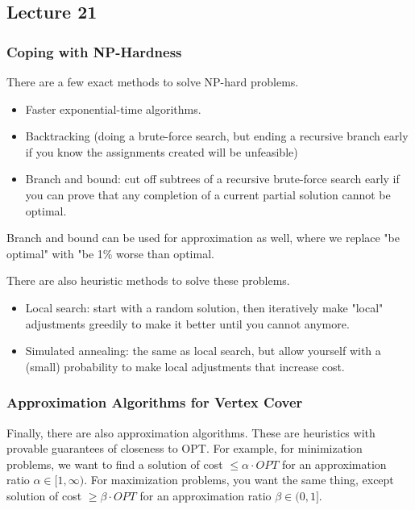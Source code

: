 \subsection{Lecture 21}
\subsubsection{Coping with NP-Hardness}

There are a few exact methods to solve NP-hard problems.
\begin{itemize}
    \item Faster exponential-time algorithms.
    \item Backtracking (doing a brute-force search, but ending a recursive branch early if you know the assignments created will be unfeasible)
    \item Branch and bound: cut off subtrees of a recursive brute-force search early if you can prove that any completion of a current partial solution cannot be optimal.
\end{itemize}

Branch and bound can be used for approximation as well, where we replace "be optimal" with "be 1\% worse than optimal.

There are also heuristic methods to solve these problems.
\begin{itemize}
    \item Local search: start with a random solution, then iteratively make "local" adjustments greedily to make it better until you cannot anymore.
    \item Simulated annealing: the same as local search, but allow yourself with a (small) probability to make local adjustments that increase cost.
\end{itemize}

\subsubsection{Approximation Algorithms for Vertex Cover}

Finally, there are also approximation algorithms. These are heuristics with provable guarantees of closeness to OPT.
For example, for minimization problems, we want to find a solution of cost $\leq \alpha \cdot OPT$ for an approximation ratio $\alpha \in [1, \infty)$.
For maximization problems, you want the same thing, except solution of cost $\geq \beta \cdot OPT$ for an approximation ratio $\beta \in (0, 1]$.

